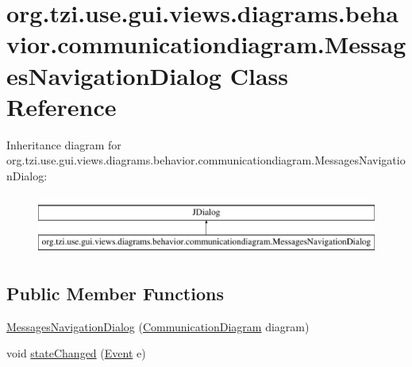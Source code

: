\hypertarget{classorg_1_1tzi_1_1use_1_1gui_1_1views_1_1diagrams_1_1behavior_1_1communicationdiagram_1_1_messages_navigation_dialog}{\section{org.\-tzi.\-use.\-gui.\-views.\-diagrams.\-behavior.\-communicationdiagram.\-Messages\-Navigation\-Dialog Class Reference}
\label{classorg_1_1tzi_1_1use_1_1gui_1_1views_1_1diagrams_1_1behavior_1_1communicationdiagram_1_1_messages_navigation_dialog}
}
Inheritance diagram for org.\-tzi.\-use.\-gui.\-views.\-diagrams.\-behavior.\-communicationdiagram.\-Messages\-Navigation\-Dialog\-:\begin{figure}[H]
\begin{center}
\leavevmode
\includegraphics[height=2.000000cm]{classorg_1_1tzi_1_1use_1_1gui_1_1views_1_1diagrams_1_1behavior_1_1communicationdiagram_1_1_messages_navigation_dialog}
\end{center}
\end{figure}
\subsection*{Public Member Functions}
\begin{DoxyCompactItemize}
\item 
\hyperlink{classorg_1_1tzi_1_1use_1_1gui_1_1views_1_1diagrams_1_1behavior_1_1communicationdiagram_1_1_messages_navigation_dialog_a21979b94591e32cb48da6a25b4e7d123}{Messages\-Navigation\-Dialog} (\hyperlink{classorg_1_1tzi_1_1use_1_1gui_1_1views_1_1diagrams_1_1behavior_1_1communicationdiagram_1_1_communication_diagram}{Communication\-Diagram} diagram)
\item 
void \hyperlink{classorg_1_1tzi_1_1use_1_1gui_1_1views_1_1diagrams_1_1behavior_1_1communicationdiagram_1_1_messages_navigation_dialog_a2a878f361a2e0d8f51675bffe0d890d0}{state\-Changed} (\hyperlink{classorg_1_1tzi_1_1use_1_1uml_1_1sys_1_1events_1_1_event}{Event} e)
\end{DoxyCompactItemize}


